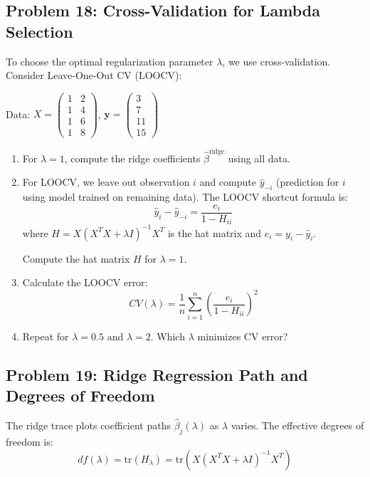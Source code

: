 \documentclass[12pt]{article}
\begin{document}
\subsection*{Problem 18: Cross-Validation for Lambda Selection}

To choose the optimal regularization parameter \(\lambda\), we use cross-validation. Consider Leave-One-Out CV (LOOCV):

Data: \(X = \begin{pmatrix} 1 & 2 \\ 1 & 4 \\ 1 & 6 \\ 1 & 8 \end{pmatrix}\), \(\mathbf{y} = \begin{pmatrix} 3 \\ 7 \\ 11 \\ 15 \end{pmatrix}\)

\begin{enumerate}[label=(\alph*)]
\item For \(\lambda = 1\), compute the ridge coefficients \(\hat{\beta}^{\text{ridge}}\) using all data.

\item For LOOCV, we leave out observation \(i\) and compute \(\hat{y}_{-i}\) (prediction for \(i\) using model trained on remaining data). The LOOCV shortcut formula is:
\[
\hat{y}_i - \hat{y}_{-i} = \frac{e_i}{1 - H_{ii}}
\]
where \(H = X(X^TX + \lambda I)^{-1}X^T\) is the hat matrix and \(e_i = y_i - \hat{y}_i\).

Compute the hat matrix \(H\) for \(\lambda = 1\).

\item Calculate the LOOCV error:
\[
CV(\lambda) = \frac{1}{n}\sum_{i=1}^{n}\left(\frac{e_i}{1 - H_{ii}}\right)^2
\]

\item Repeat for \(\lambda = 0.5\) and \(\lambda = 2\). Which \(\lambda\) minimizes CV error?
\end{enumerate}

\subsection*{Problem 19: Ridge Regression Path and Degrees of Freedom}

The ridge trace plots coefficient paths \(\hat{\beta}_j(\lambda)\) as \(\lambda\) varies. The effective degrees of freedom is:
\[
df(\lambda) = \text{tr}(H_\lambda) = \text{tr}(X(X^TX + \lambda I)^{-1}X^T)
\]
\end{document}
